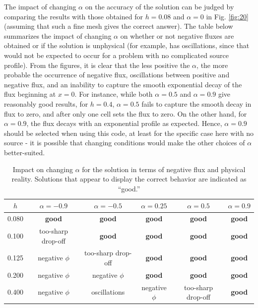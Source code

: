 \documentclass[10pt]{article}
\begin{document}
The impact of changing \(\alpha\) on the accuracy of the solution can be judged by comparing the results with those obtained for \(h=0.08\) and \(\alpha=0\) in Fig. \ref{fig:20} (assuming that such a fine mesh gives the correct answer). The table below summarizes the impact of changing \(\alpha\) on whether or not negative fluxes are obtained or if the solution is unphysical (for example, has oscillations, since that would not be expected to occur for a problem with no complicated source profile). From the figures, it is clear that the less positive the \(\alpha\), the more probable the occurrence of negative flux, oscillations between positive and negative flux, and an inability to capture the smooth exponential decay of the flux beginning at \(x=0\). For instance, while both \(\alpha=0.5\) and \(\alpha=0.9\) give reasonably good results, for \(h=0.4\), \(\alpha=0.5\) fails to capture the smooth decay in flux to zero, and after only one cell sets the flux to zero. On the other hand, for \(\alpha=0.9\), the flux decays with an exponential profile as expected. Hence, \(\alpha=0.9\) should be selected when using this code, at least for the specific case here with no source - it is possible that changing conditions would make the other choices of \(\alpha\) better-suited.

\begin{table}[H]
\caption{Impact on changing \(\alpha\) for the solution in terms of negative flux and physical reality. Solutions that appear to display the correct behavior are indicated as ``good.''}
\centering
\begin{tabular}{c c c c c c}
\hline\hline
\(h\) & \(\alpha=-0.9\) & \(\alpha=-0.5\) & \(\alpha=0.25\) & \(\alpha=0.5\) & \(\alpha=0.9\)\\ [0.5ex]
\hline
0.080 & \textbf{good}			& \textbf{good}		& \textbf{good}		& \textbf{good}			& \textbf{good}\\
0.100 & too-sharp drop-off		& \textbf{good}		& \textbf{good}		& \textbf{good} 			& \textbf{good}\\
0.125 & negative \(\phi\)		& too-sharp drop-off	& \textbf{good}		& \textbf{good} 			& \textbf{good}\\
0.200 & negative \(\phi\)		& negative \(\phi\)	& \textbf{good}		& \textbf{good} 			& \textbf{good}\\
0.400 & negative \(\phi\)		& oscillations		& negative \(\phi\)	& too-sharp drop-off		& \textbf{good}\\
\hline
\end{tabular}
\label{table:3}
\end{table}
\end{document}
